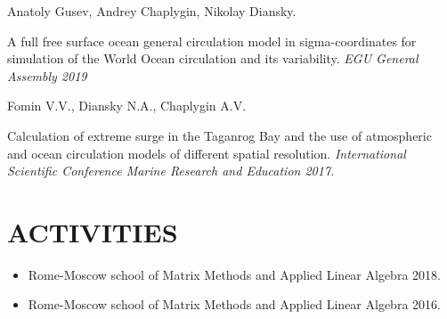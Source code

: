 \documentclass[paper=a4,fontsize=11pt]{scrartcl}
\newcommand{\sepspace}{\vspace*{1em}}		%
\newcommand{\NewPart}[1]{\section*{\uppercase{#1}}}
\begin{document}
Anatoly Gusev, Andrey Chaplygin, Nikolay Diansky. 

A full free surface ocean general circulation model in sigma-coordinates for simulation of the World Ocean circulation and its variability. 
\textit{EGU General Assembly 2019} %
\sepspace

Fomin V.V., Diansky N.A., Chaplygin A.V.

Calculation of extreme surge in the Taganrog Bay and the use of atmospheric and ocean circulation models of different spatial resolution.
\textit{International Scientific Conference Marine Research and Education 2017. }

\NewPart{Activities}{}
\begin{itemize}
 \item
Rome-Moscow school of Matrix Methods and Applied Linear Algebra 2018. 
\sepspace

\item
Rome-Moscow school of Matrix Methods and Applied Linear Algebra 2016.

\end{itemize}
\end{document}
